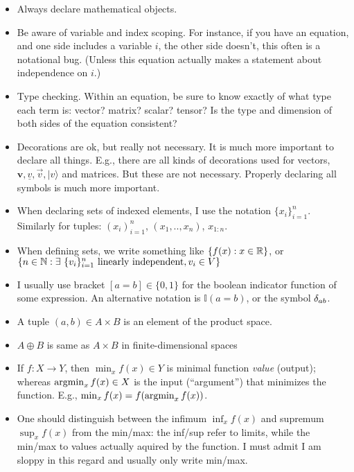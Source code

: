 \begin{itemize}
\item Always declare mathematical objects.
\item Be aware of variable and index scoping. For instance, if you have an
equation, and one side includes a variable $i$, the other side doesn't,
this often is a notational bug. (Unless this equation actually makes
a statement about independence on $i$.)
\item Type checking. Within an equation, be sure to know exactly of
what type each term is: vector? matrix? scalar? tensor? Is the type and dimension of both sides of the equation consistent?
\item Decorations are ok, but really not necessary. It is much more
important to declare all things. E.g., there are all kinds of decorations used for vectors, $\boldsymbol
v, \underline v, \overrightarrow v, |v\rangle$ and matrices. But these are
not necessary. Properly declaring all symbols is much more
important.
\item When declaring sets of indexed elements, I use the notation $\{ x_i \}_{i=1}^n$. Similarly for tuples: $(x_i)_{i=1}^n$,
  $(x_1,..,x_n)$, $x_{1:n}$.
\item When defining sets, we write something like $\{ f(x) : x \in{\mathbb{R}} \}$, or $\{ n \in{\mathbb{N}} : \exists~\{
v_i\}_{i=1}^n~ \text{linearly independent}, v_i \in V\}$
\item I usually use bracket $[a=b] \in \{0,1\}$ for the boolean indicator function of some expression. An alternative notation is $\mathbb I(a=b)$, or the   symbol $\delta_{ab}$.
\item A tuple $(a,b) \in A \times B$ is an element of the product space.
\item {} $A \oplus B$ is same as $A \times B$ in
finite-dimensional spaces
\item If $f: X \to Y$, then $\min_x f(x) \in Y$ is minimal function \emph{value} (output); whereas $\operatorname*{argmin}_x f(x) \in X$ is the input (``argument'') that minimizes the function. E.g., $\min_x f(x) = f(\operatorname*{argmin}_x f(x))$.
\item One should distinguish between the infimum $\inf_x f(x)$ and supremum $\sup_x f(x)$ from the min/max: the inf/sup refer to limits, while the min/max to values actually aquired by the function. I must admit I am sloppy in this regard and usually only write min/max.

\end{itemize}

